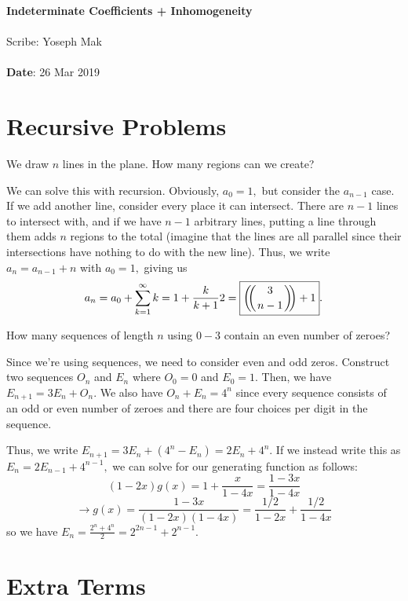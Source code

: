 \documentclass[11pt,twosided]{article}
\def\titlestring{Indeterminate Coefficients + Inhomogeneity}
\def\scribestring{Yoseph Mak}
\def\datestring{26 Mar 2019}
\def\multiset#1#2{\ensuremath{\left(\kern-.3em\left(\genfrac{}{}{0pt}{}{#1}{#2}\right)\kern-.3em\right)}}
\begin{document}
\thispagestyle{plain}  %

\noindent
{\LARGE \textbf{\titlestring}}\\\\
%
{\Large Scribe: \scribestring}\\ \\
{\textbf{Date}: \datestring}


\noindent

\section{Recursive Problems}

 We draw $n$ lines in the plane. How many regions can we create?

\solution We can solve this with recursion. Obviously, $a_0=1,$ but consider the $a_{n-1}$ case. If we add another line, consider every place it can intersect. There are $n-1$ lines to intersect with, and if we have $n-1$ arbitrary lines, putting a line through them adds $n$ regions to the total (imagine that the lines are all parallel since their intersections have nothing to do with the new line). Thus, we write $a_n=a_{n-1}+n$ with $a_0=1,$ giving us $$a_n=a_0+\sum_{k=1}^{\infty}k=1+\frac{k}{k+1}{2}=\boxed{\multiset{3}{n-1}+1}.$$

 How many sequences of length $n$ using $0-3$ contain an even number of zeroes?

\solution Since we're using sequences, we need to consider even and odd zeros. Construct two sequences $O_n$ and $E_n$ where $O_0=0$ and $E_0=1.$ Then, we have $E_{n+1}=3E_n+O_n.$ We also have $O_n+E_n=4^n$ since every sequence consists of an odd or even number of zeroes and there are four choices per digit in the sequence.

Thus, we write $E_{n+1}=3E_n+(4^n-E_n)=2E_n+4^n.$ If we instead write this as $E_n=2E_{n-1}+4^{n-1},$ we can solve for our generating function as follows: $$(1-2x)g(x)=1+\frac{x}{1-4x}=\frac{1-3x}{1-4x}$$
$$\rightarrow g(x)=\frac{1-3x}{(1-2x)(1-4x)}=\frac{1/2}{1-2x}+\frac{1/2}{1-4x}$$
so we have $E_n=\boxed{\frac{2^n+4^n}{2}}=2^{2n-1}+2^{n-1}.$

\section{Extra Terms}
\end{document}
